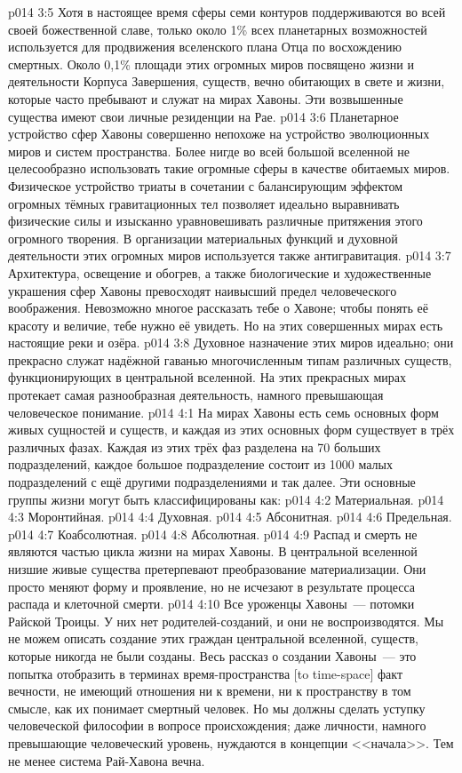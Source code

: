 \vs p014 3:5 Хотя в настоящее время сферы семи контуров поддерживаются во всей своей божественной славе, только около 1\% всех планетарных возможностей используется для продвижения вселенского плана Отца по восхождению смертных. Около 0,1\% площади этих огромных миров посвящено жизни и деятельности Корпуса Завершения, существ, вечно обитающих в свете и жизни, которые часто пребывают и служат на мирах Хавоны. Эти возвышенные существа имеют свои личные резиденции на Рае.
\vs p014 3:6 Планетарное устройство сфер Хавоны совершенно непохоже на устройство эволюционных миров и систем пространства. Более нигде во всей большой вселенной не целесообразно использовать такие огромные сферы в качестве обитаемых миров. Физическое устройство триаты в сочетании с балансирующим эффектом огромных тёмных гравитационных тел позволяет идеально выравнивать физические силы и изысканно уравновешивать различные притяжения этого огромного творения. В организации материальных функций и духовной деятельности этих огромных миров используется также антигравитация.
\vs p014 3:7 Архитектура, освещение и обогрев, а также биологические и художественные украшения сфер Хавоны превосходят наивысший предел человеческого воображения. Невозможно многое рассказать тебе о Хавоне; чтобы понять её красоту и величие, тебе нужно её увидеть. Но на этих совершенных мирах есть настоящие реки и озёра.
\vs p014 3:8 Духовное назначение этих миров идеально; они прекрасно служат надёжной гаванью многочисленным типам различных существ, функционирующих в центральной вселенной. На этих прекрасных мирах протекает самая разнообразная деятельность, намного превышающая человеческое понимание.
\vs p014 4:1 На мирах Хавоны есть семь основных форм живых сущностей и существ, и каждая из этих основных форм существует в трёх различных фазах. Каждая из этих трёх фаз разделена на 70 больших подразделений, каждое большое подразделение состоит из 1000 малых подразделений с ещё другими подразделениями и так далее. Эти основные группы жизни могут быть классифицированы как:
\vs p014 4:2 Материальная.
\vs p014 4:3 Моронтийная.
\vs p014 4:4 Духовная.
\vs p014 4:5 Абсонитная.
\vs p014 4:6 Предельная.
\vs p014 4:7 Коабсолютная.
\vs p014 4:8 Абсолютная.
\vs p014 4:9 \pc Распад и смерть не являются частью цикла жизни на мирах Хавоны. В центральной вселенной низшие живые существа претерпевают преобразование материализации. Они просто меняют форму и проявление, но не исчезают в результате процесса распада и клеточной смерти.
\vs p014 4:10 \pc Все уроженцы Хавоны~--- потомки Райской Троицы. У них нет родителей\hyp{}созданий, и они не воспроизводятся. Мы не можем описать создание этих граждан центральной вселенной, существ, которые никогда не были созданы. Весь рассказ о создании Хавоны~--- это попытка отобразить в терминах время\hyp{}пространства [to time\hyp{}space] факт вечности, не имеющий отношения ни к времени, ни к пространству в том смысле, как их понимает смертный человек. Но мы должны сделать уступку человеческой философии в вопросе происхождения; даже личности, намного превышающие человеческий уровень, нуждаются в концепции <<начала>>. Тем не менее система Рай\hyp{}Хавона вечна.
